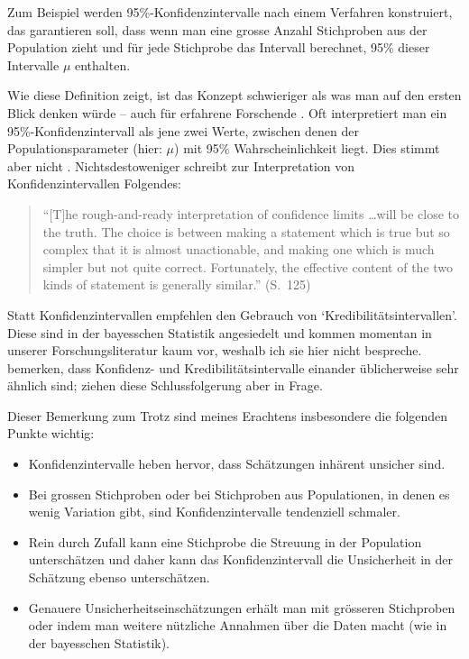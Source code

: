 \documentclass[oneside, 10pt]{book}\usepackage[]{graphicx}\usepackage[]{xcolor}
\begin{document}
Zum Beispiel werden 95\%-Konfidenzintervalle nach einem Verfahren
konstruiert, das garantieren soll, dass wenn man eine grosse
Anzahl Stichproben aus der Population zieht und für jede Stichprobe
das Intervall berechnet, 95\% dieser Intervalle $\mu$ enthalten.

Wie diese Definition zeigt, ist das Konzept schwieriger als was man auf den ersten Blick denken würde -- auch für erfahrene Forschende \citep{Hoekstra2014}. Oft interpretiert man ein 95\%-Konfidenzintervall als jene zwei Werte, zwischen denen der Populationsparameter (hier: $\mu$) mit 95\% Wahrscheinlichkeit liegt. Dies stimmt aber nicht \citep{Morey2016}.
Nichtsdestoweniger schreibt \citet{Ehrenberg1982} zur Interpretation
von Konfidenzintervallen Folgendes:
\begin{quote}
``[T]he rough-and-ready interpretation of confidence limits \dots will be close
to the truth. The choice is between making a statement which is true but so
complex that it is almost unactionable, and making one which is much simpler
but not quite correct. Fortunately, the effective content of the two kinds
of statement is generally similar.'' (S.\ 125)
\end{quote}

Statt Konfidenzintervallen empfehlen
\citet{Morey2016} den Gebrauch
von `Kredibilitätsintervallen'. Diese sind
in der bayesschen Statistik
angesiedelt und kommen momentan in
unserer Forschungsliteratur kaum vor,
weshalb ich sie hier nicht bespreche.
\citet{Albers2018} bemerken, dass Konfidenz- und
Kredibilitätsintervalle einander üblicherweise sehr ähnlich sind;
\citet{Nalborczyk2018} ziehen diese Schlussfolgerung aber in Frage.

Dieser Bemerkung zum Trotz sind meines Erachtens insbesondere die
folgenden Punkte wichtig:
\begin{itemize}
 \item Konfidenzintervalle heben hervor, dass Schätzungen inhärent unsicher sind.

 \item Bei grossen Stichproben oder bei Stichproben aus
 Populationen, in denen es wenig Variation gibt, sind Konfidenzintervalle
 tendenziell schmaler.

 \item Rein durch Zufall kann eine Stichprobe die Streuung
 in der Population unterschätzen und daher kann das Konfidenzintervall
 die Unsicherheit in der Schätzung ebenso unterschätzen.

 \item Genauere Unsicherheitseinschätzungen erhält man mit
 grösseren Stichproben oder indem man weitere nützliche Annahmen
 über die Daten macht (wie in der bayesschen Statistik).
\end{itemize}
\end{document}

